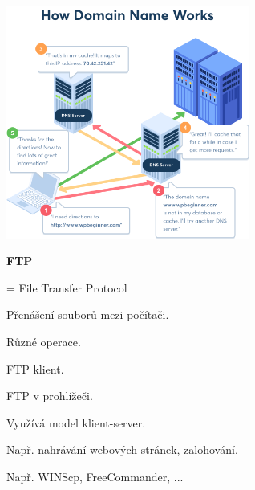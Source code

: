 \documentclass[aspectratio=1610]{beamer}
\begin{document}
\begin{frame}
    \begin{center}
    \includegraphics[width=0.6\textwidth]{img/dns.png}
    \end{center}
\end{frame}

\begin{frame}
    \begin{cardTiny}
        \textbf{FTP}
        
        \begin{flushleft}
            = File Transfer Protocol

            \vspace{2ex}
            Přenášení souborů mezi počítači.

            Různé operace.

            \vspace{2ex}
            FTP klient.

            FTP v prohlížeči.

            \vspace{2ex}
            Využívá model klient-server.

            Např. nahrávání webových stránek, zalohování.

            Např. WINScp, FreeCommander, ...
        \end{flushleft}
    \end{cardTiny}
\end{frame}
\end{document}
